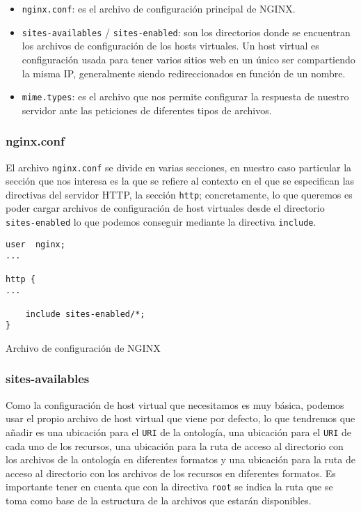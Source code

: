 \begin{itemize}
	\item {\tt nginx.conf}: es el archivo de configuración principal de {\sf NGINX}.
	\item {\tt sites-availables} / {\tt sites-enabled}: son los directorios donde se encuentran los archivos de configuración de los {\sf hosts virtuales}. Un host virtual es configuración usada para tener varios sitios web en un único ser compartiendo la misma IP, generalmente siendo redireccionados en función de un nombre.
	\item {\tt mime.types}: es el archivo que nos permite configurar la respuesta de nuestro servidor ante las peticiones de diferentes tipos de archivos.
\end{itemize}

\subsubsection{nginx.conf}

El archivo {\tt nginx.conf} se divide en varias secciones, en nuestro caso particular la sección que nos interesa es la que se refiere al contexto en el que se especifican las directivas del {\sf servidor HTTP}, la sección {\tt http}; concretamente, lo que queremos es poder cargar archivos de configuración de host virtuales desde el directorio {\tt sites-enabled} lo que podemos conseguir mediante la directiva {\tt include}.
\bigskip

\begin{listing}[!ht]
\begin{verbatim}
user  nginx;
...

http {
...

    include sites-enabled/*;
}
\end{verbatim}
\caption{Archivo de configuración de {\sf NGINX}}
\end{listing}

\subsubsection{sites-availables}

Como la configuración de host virtual que necesitamos es muy básica, podemos usar el propio archivo de host virtual que viene por defecto, lo que tendremos que añadir es una ubicación para el {\tt URI} de la ontología, una ubicación para el {\tt URI} de cada uno de los recursos, una ubicación para la ruta de acceso al directorio con los archivos de la ontología en diferentes formatos y una ubicación para la ruta de acceso al directorio con los archivos de los recursos en diferentes formatos. Es importante tener en cuenta que con la directiva {\tt root} se indica la ruta que se toma como base de la estructura de la archivos que estarán disponibles.

